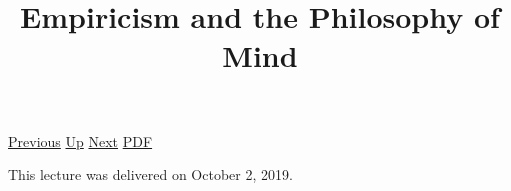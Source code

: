 \documentclass[12pt,a4paper]{report}
\begin{document}
 \href{doc/phil/People/Brandom/OnSellars/2019/EarlyWritingsII.html}{Previous} 
 \href{doc/phil/People/Brandom/OnSellars/2019.html}{Up} 
 \href{doc/phil/People/Brandom/OnSellars/2019/InferentialismandNormativity.html}{Next} 
 \href{doc/phil/People/Brandom/OnSellars/2019/EmpiricismandthePhilosophyofMind.pdf}{PDF} 
\title{Empiricism and the Philosophy of Mind}

\tableofcontents
This lecture was delivered on October 2, 2019.
\end{document}
